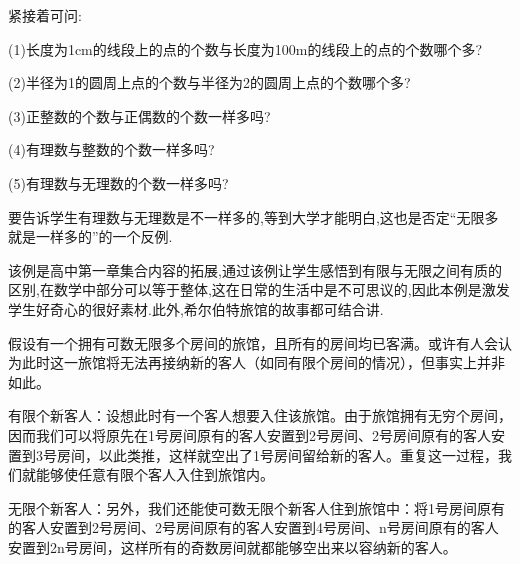 \begin{example}[等势集合]
\begin{center}
\begin{tikzpicture}[x=0.75pt,y=0.75pt,yscale=-1,xscale=1,scale=0.8]
		\end{tikzpicture}
	\end{center}

	紧接着可问:

	(1)长度为1cm的线段上的点的个数与长度为100m的线段上的点的个数哪个多?

	(2)半径为1的圆周上点的个数与半径为2的圆周上点的个数哪个多?

	(3)正整数的个数与正偶数的个数一样多吗?

	(4)有理数与整数的个数一样多吗?

	(5)有理数与无理数的个数一样多吗?

	要告诉学生有理数与无理数是不一样多的,等到大学才能明白,这也是否定“无限多就是一样多的”的一个反例.
\end{example}
\begin{purpose}
	该例是高中第一章集合内容的拓展,通过该例让学生感悟到有限与无限之间有质的区别,在数学中部分可以等于整体,这在日常的生活中是不可思议的,因此本例是激发学生好奇心的很好素材.此外,希尔伯特旅馆的故事都可结合讲.
\end{purpose}
\begin{note}
	假设有一个拥有可数无限多个房间的旅馆，且所有的房间均已客满。或许有人会认为此时这一旅馆将无法再接纳新的客人（如同有限个房间的情况），但事实上并非如此。

	有限个新客人：设想此时有一个客人想要入住该旅馆。由于旅馆拥有无穷个房间，因而我们可以将原先在1号房间原有的客人安置到2号房间、2号房间原有的客人安置到3号房间，以此类推，这样就空出了1号房间留给新的客人。重复这一过程，我们就能够使任意有限个客人入住到旅馆内。

	无限个新客人：另外，我们还能使可数无限个新客人住到旅馆中：将1号房间原有的客人安置到2号房间、2号房间原有的客人安置到4号房间、n号房间原有的客人安置到2n号房间，这样所有的奇数房间就都能够空出来以容纳新的客人。
\end{note}

